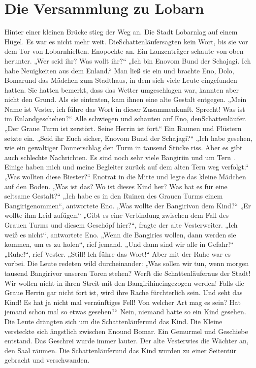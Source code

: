 \documentclass[12pt,a4paper,onecolumn,twoside,ngerman]{book}
\newcommand{\Tern}{Tern }
\newcommand{\Bangiri}{Bangiri}
\newcommand{\Enland}{Enland}
\newcommand{\Schattenjager}{Schattenläufer}
\newcommand{\Eno}{Eno}
\newcommand{\Bomar}{Bomar}
\newcommand{\Dolo}{Dolo}
\newcommand{\Lobarn}{Lobarn}
\newcommand{\Vester}{Vester}
\begin{document}
\section{Die Versammlung zu \Lobarn}
Hinter einer kleinen Brücke stieg der Weg an. Die Stadt \Lobarn lag auf einem  Hügel. Es war es nicht mehr weit. Die\Schattenjager sagten kein Wort, bis sie vor dem Tor von \Lobarn hielten. \Eno pochte an.
Ein Lanzenträger schaute von oben herunter. 
„Wer seid ihr? Was wollt ihr?“
„Ich bin \Eno vom Bund der Schajagi. Ich habe Neuigkeiten aus dem \Enland.“ 
Man ließ sie ein und brachte \Eno, \Dolo, \Bomar und das Mädchen zum Stadthaus, in dem sich viele Leute eingefunden hatten. Sie hatten bemerkt, dass das Wetter umgeschlagen war, kannten aber nicht den Grund. Als sie eintraten, kam ihnen eine alte Gestalt entgegen. 
„Mein Name ist \Vester, ich führe das Wort in dieser Zusammenkunft. Sprecht! Was ist im \Enland geschehen?“
Alle schwiegen und schauten auf \Eno, den\Schattenjager.
„Der Graue Turm ist zerstört. Seine Herrin ist fort.“
Ein Raunen und Flüstern setzte ein.
„Seid ihr Euch sicher, \Eno vom Bund der Schajagi?“
„Ich habe gesehen, wie ein gewaltiger Donnerschlag den Turm in tausend Stücke riss. Aber es gibt auch schlechte Nachrichten. Es sind noch sehr viele \Bangiri in und um \Tern. Einige haben mich und meine Begleiter zurück auf dem alten \Tern{weg} verfolgt.“
„Was wollten diese Biester?“
\Eno trat in die Mitte und legte das kleine Mädchen auf den Boden.
„Was ist das? Wo ist dieses Kind her? Was hat es für eine seltsame Gestalt?“
„Ich habe es in den Ruinen des Grauen Turms einem \Bangiri genommen“, antwortete \Eno.
„Was wollte der \Bangiri von dem Kind?“
„Er wollte ihm Leid zufügen.“
„Gibt es eine Verbindung zwischen dem Fall des Grauen Turms und diesem Geschöpf hier?“, fragte der alte \Vester weiter.
„Ich weiß es nicht“, antwortete \Eno.
„Wenn die \Bangiri es wollen, dann werden sie kommen, um es zu holen“, rief jemand. „Und dann sind wir alle in Gefahr!“
„Ruhe!“, rief \Vester. „Still! Ich führe das Wort!“
Aber mit der Ruhe war es vorbei. Die Leute redeten wild durcheinander: „Was sollen wir tun, wenn morgen tausend \Bangiri vor unseren Toren stehen? Werft die \Schattenjager aus der Stadt! Wir wollen nicht in ihren Streit mit den \Bangiri hineingezogen werden! Falls die Graue Herrin gar nicht fort ist, wird ihre Rache fürchterlich sein. Und seht das Kind! Es hat ja nicht mal vernünftiges Fell! Von welcher Art mag es sein? Hat jemand schon mal so etwas gesehen?“
Nein, niemand hatte so ein Kind gesehen. Die Leute drängten sich um die \Schattenjager und das Kind. Die Kleine versteckte sich ängstlich zwischen \Eno und \Bomar. Ein Gemurmel und Geschiebe entstand. Das Geschrei wurde immer lauter. Der alte \Vester wies die Wächter an, den Saal räumen. Die \Schattenjager und das Kind wurden zu einer Seitentür gebracht und verschwanden.
\end{document}
